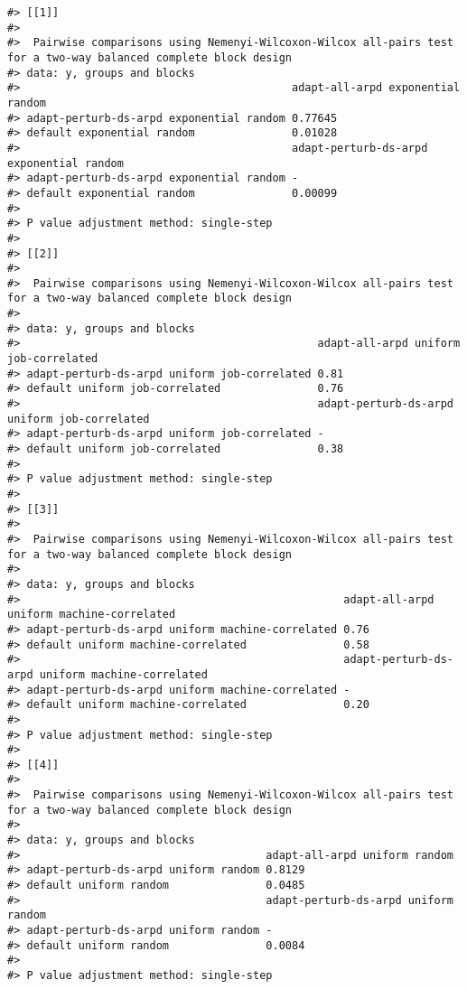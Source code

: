 \documentclass[
]{article}
\begin{document}
\begin{verbatim}
#> [[1]]
#> 
#>  Pairwise comparisons using Nemenyi-Wilcoxon-Wilcox all-pairs test for a two-way balanced complete block design
#> data: y, groups and blocks
#>                                          adapt-all-arpd exponential random
#> adapt-perturb-ds-arpd exponential random 0.77645                          
#> default exponential random               0.01028                          
#>                                          adapt-perturb-ds-arpd exponential random
#> adapt-perturb-ds-arpd exponential random -                                       
#> default exponential random               0.00099
#> 
#> P value adjustment method: single-step
#> 
#> [[2]]
#> 
#>  Pairwise comparisons using Nemenyi-Wilcoxon-Wilcox all-pairs test for a two-way balanced complete block design
#> 
#> data: y, groups and blocks
#>                                              adapt-all-arpd uniform job-correlated
#> adapt-perturb-ds-arpd uniform job-correlated 0.81                                 
#> default uniform job-correlated               0.76                                 
#>                                              adapt-perturb-ds-arpd uniform job-correlated
#> adapt-perturb-ds-arpd uniform job-correlated -                                           
#> default uniform job-correlated               0.38
#> 
#> P value adjustment method: single-step
#> 
#> [[3]]
#> 
#>  Pairwise comparisons using Nemenyi-Wilcoxon-Wilcox all-pairs test for a two-way balanced complete block design
#> 
#> data: y, groups and blocks
#>                                                  adapt-all-arpd uniform machine-correlated
#> adapt-perturb-ds-arpd uniform machine-correlated 0.76                                     
#> default uniform machine-correlated               0.58                                     
#>                                                  adapt-perturb-ds-arpd uniform machine-correlated
#> adapt-perturb-ds-arpd uniform machine-correlated -                                               
#> default uniform machine-correlated               0.20
#> 
#> P value adjustment method: single-step
#> 
#> [[4]]
#> 
#>  Pairwise comparisons using Nemenyi-Wilcoxon-Wilcox all-pairs test for a two-way balanced complete block design
#> 
#> data: y, groups and blocks
#>                                      adapt-all-arpd uniform random
#> adapt-perturb-ds-arpd uniform random 0.8129                       
#> default uniform random               0.0485                       
#>                                      adapt-perturb-ds-arpd uniform random
#> adapt-perturb-ds-arpd uniform random -                                   
#> default uniform random               0.0084
#> 
#> P value adjustment method: single-step
\end{verbatim}
\end{document}
